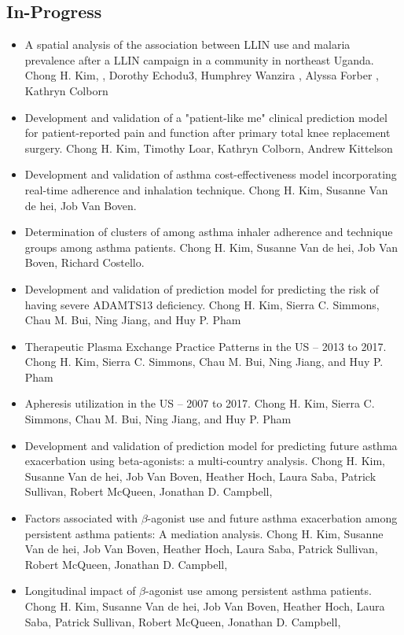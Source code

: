 \documentclass[paper=a4,fontsize=11pt]{scrartcl} %
\begin{document}
\subsection*{In-Progress}
\begin{itemize}
    \item A spatial analysis of the association between LLIN use and malaria prevalence after a LLIN campaign in a community in northeast Uganda. Chong H. Kim, , Dorothy Echodu3, Humphrey Wanzira , Alyssa Forber , Kathryn Colborn
    \item Development and validation of a "patient-like me" clinical prediction model for patient-reported pain and function after primary total knee replacement surgery. Chong H. Kim,  Timothy Loar, Kathryn Colborn, Andrew Kittelson
    \item Development and validation of asthma cost-effectiveness model incorporating real-time adherence and inhalation technique. Chong H. Kim, Susanne Van de hei, Job Van Boven.  
    \item Determination of clusters of among asthma inhaler adherence and technique groups among asthma patients. Chong H. Kim, Susanne Van de hei, Job Van Boven, Richard Costello.  
    \item Development and validation of prediction model for predicting the risk of having severe ADAMTS13 deficiency. Chong H. Kim, Sierra C. Simmons, Chau M. Bui, Ning Jiang, and Huy P. Pham
    \item Therapeutic Plasma Exchange Practice Patterns in the US – 2013 to 2017. Chong H. Kim, Sierra C. Simmons, Chau M. Bui, Ning Jiang, and Huy P. Pham
    \item Apheresis utilization in the US – 2007 to 2017. Chong H. Kim, Sierra C. Simmons, Chau M. Bui, Ning Jiang, and Huy P. Pham
    \item Development and validation of prediction model for predicting future asthma exacerbation using beta-agonists: a multi-country analysis. Chong H. Kim, Susanne Van de hei, Job Van Boven, Heather Hoch, Laura Saba, Patrick Sullivan, Robert McQueen, Jonathan D. Campbell,
    \item Factors associated with $\beta$-agonist use and future asthma exacerbation among persistent asthma patients: A mediation analysis. Chong H. Kim, Susanne Van de hei, Job Van Boven, Heather Hoch, Laura Saba, Patrick Sullivan, Robert McQueen, Jonathan D. Campbell,
    \item Longitudinal impact of $\beta$-agonist use among persistent asthma patients. Chong H. Kim, Susanne Van de hei, Job Van Boven, Heather Hoch, Laura Saba, Patrick Sullivan, Robert McQueen, Jonathan D. Campbell,
\end{itemize}
\end{document}

